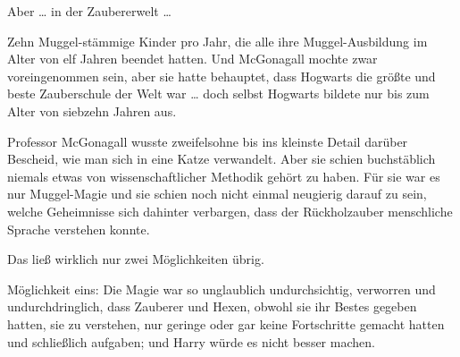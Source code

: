 Aber … in der Zaubererwelt …

Zehn Muggel-stämmige Kinder pro Jahr, die alle ihre Muggel-Ausbildung im Alter von elf Jahren beendet hatten. Und McGonagall mochte zwar voreingenommen sein, aber sie hatte behauptet, dass Hogwarts die größte und beste Zauberschule der Welt war … doch selbst Hogwarts bildete nur bis zum Alter von siebzehn Jahren aus.

Professor McGonagall wusste zweifelsohne bis ins kleinste Detail darüber Bescheid, wie man sich in eine Katze verwandelt. Aber sie schien buchstäblich niemals etwas von wissenschaftlicher Methodik gehört zu haben. Für sie war es nur Muggel-Magie und sie schien noch nicht einmal neugierig darauf zu sein, welche Geheimnisse sich dahinter verbargen, dass der Rückholzauber menschliche Sprache verstehen konnte.

Das ließ wirklich nur zwei Möglichkeiten übrig.

Möglichkeit eins: Die Magie war so unglaublich undurchsichtig, verworren und undurchdringlich, dass Zauberer und Hexen, obwohl sie ihr Bestes gegeben hatten, sie zu verstehen, nur geringe oder gar keine Fortschritte gemacht hatten und schließlich aufgaben; und Harry würde es nicht besser machen.

